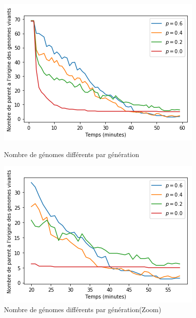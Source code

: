 \documentclass[a4paper]{article}
\begin{document}
\begin{figure}[h]
	\begin{minipage}[c]{.46\linewidth}
		\centering
		\includegraphics[width=1.1\linewidth]{../../script_results/nombre_genome_different.png}
		\caption{Nombre de génomes différents par génération}
	\end{minipage}
	\hfill%
	\begin{minipage}[c]{.46\linewidth}
		\centering
		\includegraphics[width=1.1\linewidth]{../../script_results/nombre_genome_different_zoom.png}
		\caption{Nombre de génomes différents par génération(Zoom)}
	\end{minipage}
\end{figure}
\newpage
\end{document}
